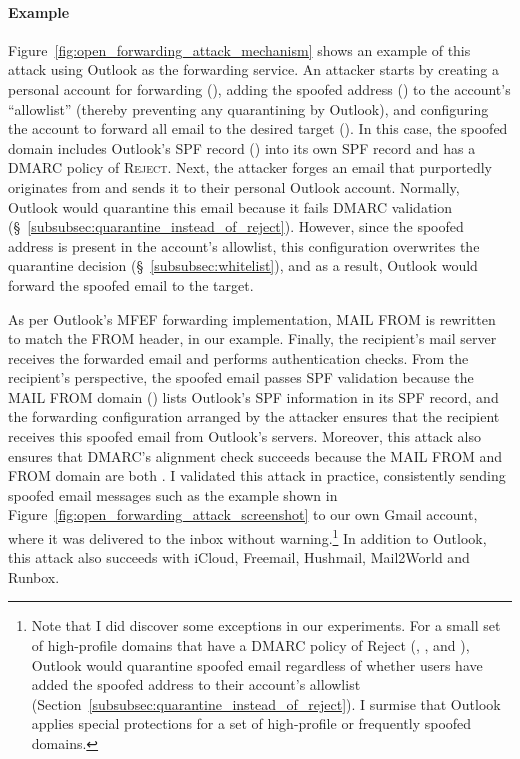 \paragraph{Example}
Figure~\ref{fig:open_forwarding_attack_mechanism} shows an example of
this attack using Outlook as the forwarding service.
An attacker starts by creating a personal account for
forwarding (), adding the spoofed address
() to the account's ``allowlist'' (thereby
preventing any quarantining by Outlook), and configuring the account to
forward all email to the desired target (). In this case, the spoofed domain  includes
Outlook's SPF record () into its own SPF record and has a DMARC policy of \textsc{Reject}. Next, the attacker forges an email that purportedly originates from  and sends it to their personal Outlook account. Normally, Outlook would quarantine this email because it fails DMARC validation (\S~\ref{subsubsec:quarantine_instead_of_reject}). However, since the spoofed address is present in the account's allowlist, this configuration overwrites the quarantine decision (\S~\ref{subsubsec:whitelist}), and as a result, Outlook would forward the spoofed email to the target.


As per Outlook's MFEF forwarding implementation,
\textsc{MAIL FROM}
is rewritten to match the
\textsc{FROM} header,  in our example. Finally, the recipient's mail server receives the forwarded email
and performs authentication checks.
From the recipient's perspective,
the spoofed email passes SPF validation because the
\textsc{MAIL FROM} domain () lists Outlook's SPF
information in its SPF record, and the forwarding configuration
arranged by the attacker ensures that the recipient receives this
spoofed email from Outlook's servers.
Moreover, this attack also
ensures that DMARC's alignment check succeeds because the
\textsc{MAIL FROM} and \textsc{FROM} domain are both .
I validated this attack in practice, consistently sending
spoofed email messages such as the example
shown in Figure~\ref{fig:open_forwarding_attack_screenshot}
to our own Gmail account, where it was delivered to the inbox without warning.\footnote{
Note that I did discover some exceptions in our experiments.
For a small set of high-profile domains that have a DMARC policy of Reject
(\eg, ,  and ), Outlook would
quarantine spoofed email regardless of whether users have added the
spoofed address to their account's allowlist (Section~\ref{subsubsec:quarantine_instead_of_reject}).
I surmise that Outlook applies special protections for a set of high-profile or frequently spoofed domains.
} 
In addition to Outlook, this attack also succeeds with
iCloud, Freemail, Hushmail, Mail2World and Runbox.


